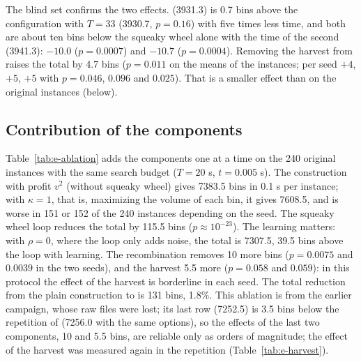 The blind set confirms the two effects. \cfgfast{} (3931.3) is 0.7 bins above the configuration with $T=33$ (3930.7, $p=0.16$) with five
times less time, and both are about ten bins below the squeaky wheel alone with the time of the second (3941.3):
$-10.0$ ($p=0.0007$) and $-10.7$ ($p=0.0004$). Removing the harvest from \cfgfast{} raises the total by 4.7 bins ($p=0.011$ on the means of
the instances; per seed $+4$, $+5$, $+5$ with $p=0.046$, $0.096$ and $0.025$). That is a smaller effect than on the original instances (below).

\subsection{Contribution of the components}
\label{sec:e-ablation}

Table~\ref{tab:e-ablation} adds the components one at a time on the 240 original instances with the same search budget
($T=20$ s, $t=0.005$ s). The construction with profit $v^2$ (without squeaky wheel) gives 7383.5 bins in 0.1 s per instance; with $\kappa=1$,
that is, maximizing the volume of each bin, it gives 7608.5, and is worse in 151 or 152 of the 240 instances depending on the seed. The squeaky
wheel loop reduces the total by 115.5 bins ($p\approx 10^{-23}$). The learning matters: with $\rho=0$,
where the loop only adds noise, the total is 7307.5, 39.5 bins above the loop with learning. The recombination removes 10 more bins ($p=0.0075$ and $0.0039$
in the two seeds), and the harvest 5.5 more ($p=0.058$ and $0.059$): in this protocol the effect of the harvest is borderline in each seed.
The total reduction from the plain construction to \cfgbal{} is 131 bins, 1.8\%. This ablation is from the earlier campaign, whose raw files were lost; its last row (7252.5) is
3.5 bins below the repetition of \cfgbal{} (7256.0 with the same options), so the effects of the last two components, 10 and 5.5 bins, are reliable only as orders of magnitude;
the effect of the harvest was measured again in the repetition (Table~\ref{tab:e-harvest}).

